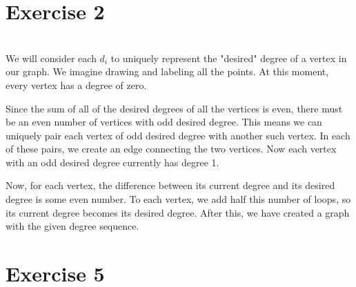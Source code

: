 \documentclass[12pt]{article}
\begin{document}
\begin{figure}[ht]
\begin{subfigure}[b]{.3\textwidth}
        \caption{}
        \label{fig:ex1-3}
    \end{subfigure}
    \caption{}
    \label{fig:ex1}
\end{figure}


\section*{Exercise 2}
\\

We will consider each $d_i$ to uniquely represent the "desired" degree of a vertex in our graph. We imagine drawing and labeling all the points. At this moment, every vertex has a degree of zero.

Since the sum of all of the desired degrees of all the vertices is even, there must be an even number of vertices with odd desired degree. This means we can uniquely pair each vertex of odd desired degree with another such vertex. In each of these pairs, we create an edge connecting the two vertices. Now each vertex with an odd desired degree currently has degree 1. 

Now, for each vertex, the difference between its current degree and its desired degree is some even number. To each vertex, we add half this number of loops, so its current degree becomes its desired degree. After this, we have created a graph with the given degree sequence.


\newpage
\section*{Exercise 5}
\\
\end{document}
